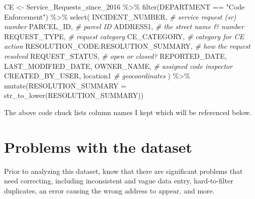 \documentclass[
  openany]{book}
\newenvironment{Shaded}{\begin{snugshade}}{\end{snugshade}}
\newcommand{\AttributeTok}[1]{\textcolor[rgb]{0.77,0.63,0.00}{#1}}
\newcommand{\CommentTok}[1]{\textcolor[rgb]{0.56,0.35,0.01}{\textit{#1}}}
\newcommand{\FunctionTok}[1]{\textcolor[rgb]{0.00,0.00,0.00}{#1}}
\newcommand{\NormalTok}[1]{#1}
\newcommand{\OtherTok}[1]{\textcolor[rgb]{0.56,0.35,0.01}{#1}}
\newcommand{\SpecialCharTok}[1]{\textcolor[rgb]{0.00,0.00,0.00}{#1}}
\newcommand{\StringTok}[1]{\textcolor[rgb]{0.31,0.60,0.02}{#1}}
\begin{document}
\begin{Shaded}
\begin{Highlighting}[]
\NormalTok{CE }\OtherTok{\textless{}{-}}\NormalTok{ Service\_Requests\_since\_2016 }\SpecialCharTok{\%\textgreater{}\%}
  \FunctionTok{filter}\NormalTok{(DEPARTMENT }\SpecialCharTok{==} \StringTok{"Code Enforcement"}\NormalTok{) }\SpecialCharTok{\%\textgreater{}\%}
  \FunctionTok{select}\NormalTok{(}
\NormalTok{    INCIDENT\_NUMBER, }\CommentTok{\#\textquotesingle{} service request (sr) number}
\NormalTok{    PARCEL\_ID, }\CommentTok{\#\textquotesingle{} parcel ID}
\NormalTok{    ADDRESS1, }\CommentTok{\#\textquotesingle{} the street name \& number}
\NormalTok{    REQUEST\_TYPE, }\CommentTok{\#\textquotesingle{} request category}
\NormalTok{    CE\_CATEGORY, }\CommentTok{\#\textquotesingle{} category for CE action}
\NormalTok{    RESOLUTION\_CODE}\SpecialCharTok{:}\NormalTok{RESOLUTION\_SUMMARY, }\CommentTok{\#\textquotesingle{} how the request resolved}
\NormalTok{    REQUEST\_STATUS, }\CommentTok{\#\textquotesingle{} open or closed?}
\NormalTok{    REPORTED\_DATE, }
\NormalTok{    LAST\_MODIFIED\_DATE, }
\NormalTok{    OWNER\_NAME, }\CommentTok{\#\textquotesingle{} assigned code inspector}
\NormalTok{    CREATED\_BY\_USER,}
\NormalTok{    location1 }\CommentTok{\#\textquotesingle{} geocoordinates}
\NormalTok{  ) }\SpecialCharTok{\%\textgreater{}\%} \FunctionTok{mutate}\NormalTok{(}\AttributeTok{RESOLUTION\_SUMMARY =} \FunctionTok{str\_to\_lower}\NormalTok{(RESOLUTION\_SUMMARY))}
\end{Highlighting}
\end{Shaded}

The above code chuck lists column names I kept which will be referenced below.

\hypertarget{problems-with-the-dataset}{%
\section{Problems with the dataset}\label{problems-with-the-dataset}}

Prior to analyzing this dataset, know that there are significant problems that need correcting, including inconsistent and vague data entry, hard-to-filter duplicates, an error causing the wrong address to appear, and more.
\end{document}
